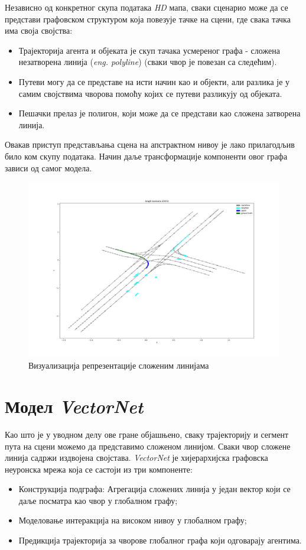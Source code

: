 \documentclass[11pt,oneside]{memoir}
\begin{document}
Независно од конкретног скупа података \textit{HD} мапа, сваки сценарио може да се представи графовском структуром која повезује тачке на сцени, где
свака тачка има своја својства:
\begin{itemize}
  \item Трајекторија агента и објеката је скуп тачака усмереног графа - сложена незатворена линија (\textit{eng. polyline}) (сваки чвор је повезан са следећим).
  \item Путеви могу да се представе на исти начин као и објекти, али разлика је у самим својствима чворова помоћу којих се путеви 
        разликују од објеката.
  \item Пешачки прелаз је полигон, који може да се представи као сложена затворена линија. 
\end{itemize}

Овакав приступ представљања сцена на апстрактном нивоу је лако прилагодљив било ком скупу података. Начин даље трансформације компоненти овог графа
зависи од самог модела. \cite{vectornet}

\begin{figure}[H]
  \includegraphics[width=1.0\textwidth]{images/polylines-representation.png}
  \caption{Визуализација репрезентације сложеним линијама}
  \label{polylines-representation}
\end{figure}

\section{Модел \textit{VectorNet}}

Као што је у уводном делу ове гране објашњено, сваку трајекторију и сегмент пута на сцени можемо да представимо сложеном линијом. Сваки
чвор сложене линија садржи издвојена својстава. \textit{VectorNet} је хијерархијска графовска неуронска мрежа која се састоји из три компоненте: \cite{vectornet}
\begin{itemize}
  \item Конструкција подграфа: Агрегација сложених линија у један вектор који се даље посматра као чвор у глобалном графу;
  \item Моделовање интеракција на високом нивоу у глобалном графу;
  \item Предикција трајекторија за чворове глобалног графа који одговарају агентима.
\end{itemize}
\end{document}

